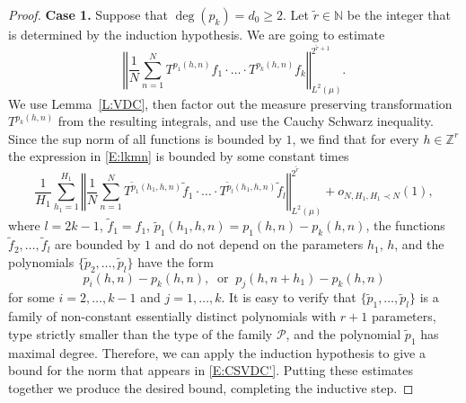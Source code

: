 \documentclass[11pt]{amsart}
\newcommand{\E}{\mathbb{E}}
\newcommand{\N}{\mathbb{N}}
\newcommand{\Z}{\mathbb{Z}}
\newcommand{\norm}[1]{\left\Vert #1\right\Vert}
\theoremstyle{plain}
\theoremstyle{definition}
\theoremstyle{remark}
\begin{document}
\begin{proof}
  {\bf Case 1.} Suppose that $\deg(p_k)=d_0\geq 2$.
Let  $\tilde{r}\in \N$  be the integer that is determined by the induction hypothesis. We are going to estimate
\begin{equation}\label{E:lkmn}
\norm{\frac{1}{N}\sum_{n=1}^N T^{p_1(h,n)}f_1\cdot
      \ldots\cdot
      T^{p_k(h,n)}f_k}_{L^2(\mu)}^{2^{\tilde{r}+1}}.
      \end{equation}
  We use Lemma~\ref{L:VDC}, then  factor out the measure preserving transformation
  $T^{p_k(h,n)}$ from the resulting integrals, and use the Cauchy
  Schwarz inequality. Since the sup norm of all
  functions is bounded by $1$, we find that for  every  $h\in \Z^r$ the expression in
  \eqref{E:lkmn} is bounded by some constant times
  \begin{equation}\label{E:CSVDC'}
    \frac{1}{H_1}\sum_{h_1=1}^{H_1}\norm{\frac{1}{N}\sum_{n=1}^N T^{\tilde{p}_1(h_1,h,n)}\tilde{f}_1\cdot \ldots\cdot
      T^{\tilde{p}_{l}(h_1,h,n)}\tilde{f}_l}_{L^2(\mu)}^{2^{\tilde{r}}} +o_{N,H_1, H_1\prec N}(1),
  \end{equation}
  where $l=2k-1$, $\tilde{f}_1=f_1$, $\tilde{p}_1(h_{1},h,n)= p_1(h,n)-p_k(h,n)$,
  the functions $\tilde{f}_2,\ldots, \tilde{f}_{l}$ are bounded by $1$ and do not depend on the parameters
  $h_{1}$, $h$, and the polynomials $\{\tilde{p}_2,\ldots,\tilde{p}_l\}$ have the form
$$
p_i(h,n)-p_k(h,n), \ \text{ or } \ p_j(h,n+h_{1})-p_k(h,n)
$$
for some  $i=2,\ldots,k-1$ and  $j=1,\ldots,k$.
It is easy to verify that  $\{\tilde{p}_1,\ldots,\tilde{p}_{l}\}$ is a family of
non-constant essentially distinct polynomials with  $r+1$ parameters,  type
strictly  smaller than the type of the family $\mathcal{P}$, and the
polynomial $\tilde{p}_1$  has maximal degree.  Therefore, we can apply the induction
hypothesis   to give
a bound for the norm that appears in \eqref{E:CSVDC'}.
 Putting these estimates together
we produce the desired bound, completing the inductive step.


\end{proof}
\end{document}
